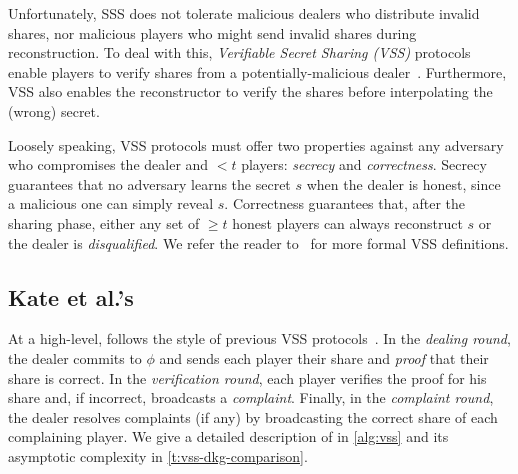%
Unfortunately, SSS does not tolerate malicious dealers who distribute invalid shares, nor malicious players who might send invalid shares during reconstruction.
To deal with this, \textit{Verifiable Secret Sharing (VSS)} protocols enable players to verify shares from a potentially-malicious dealer~\cite{CGMA85,Feldman87,Pedersen1991Non,KZG10a}.
Furthermore, VSS also enables the reconstructor to verify the shares before interpolating the (wrong) secret.

Loosely speaking, VSS protocols must offer two properties against any adversary who compromises the dealer and $<t$ players: \textit{secrecy} and \textit{correctness}.
Secrecy guarantees that no adversary learns the secret $s$ when the dealer is honest, since a malicious one can simply reveal $s$.
Correctness guarantees that, after the sharing phase, either any set of $\ge t$ honest players can always reconstruct $s$ or the dealer is \textit{disqualified}.
We refer the reader to~\cite{KZG10a} for more formal VSS definitions. %

\evssAlgorithm


\subsection{Kate et al.'s \evss}
\label{s:prelim:evss}
At a high-level, \evss follows the style of previous VSS protocols~\cite{Feldman87,Pedersen1991Non}.
In the \textit{dealing round}, the dealer commits to $\phi$ and sends each player their share and \textit{proof} that their share is correct.
In the \textit{verification round}, each player verifies the proof for his share and, if incorrect, broadcasts a \textit{complaint}.
Finally, in the \textit{complaint round}, the dealer resolves complaints (if any) by broadcasting the correct share of each complaining player.
We give a detailed description of \evss in \cref{alg:vss} and its asymptotic complexity in \cref{t:vss-dkg-comparison}.

